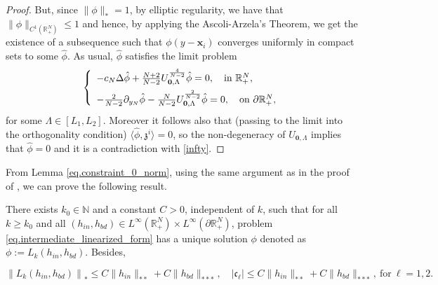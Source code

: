 \documentclass[11pt,a4paper]{amsart}
\begin{document}
\begin{proof}
But, since $\|\phi\|_*=1$, by elliptic regularity, we have that $\|\phi\|_{C^1(\mathbb R^N_+)}\leq 1$ and hence, by applying the Ascoli-Arzela's Theorem, we get the existence of a subsequence such that $\phi(y-\mathbf{x}_i)$ converges uniformly in compact sets to some $\hat\phi$. As usual, $\hat\phi$ satisfies the limit problem 
\begin{align}
  \left\{\begin{array}{l}
    -c_N\Delta \hat{\phi} +\frac{N+2}{N-2}  U_{\mathbf{0},\Lambda}^{\frac{4}{N-2}} \hat{\phi} = 0, \quad \text{in}~\mathbb{R}_{+}^{N},\vspace{5pt}\\
    -\frac{2}{N-2}\partial_{y_N}\hat{\phi} - \frac{N}{N-2} U_{\mathbf{0},\Lambda}^{\frac{2}{N-2}} \hat{\phi} = 0, \quad \text{on}~ \partial\mathbb{R}_{+}^{N},
  \end{array}\right.
\end{align}
for some $\Lambda \in\left[L_{1}, L_{2}\right]$. Moreover it follows also that (passing to the limit into the orthogonality condition) $\langle \hat \phi, \mathfrak z^i\rangle=0$, so the non-degeneracy of $ U_{\mathbf{0},\Lambda}$ \cite[Theorem 2.1]{Cruz-BlazquezPistoiaVaira_2022} implies that $\hat{\phi}=0$ and it is a contradiction with \eqref{infty}.
\end{proof}
From Lemma \ref{eq.constraint_0_norm}, using the same argument as in the proof of \cite[Proposition 4.1]{delPinoFelmerMusso_2004}, we can prove the following result.

\begin{proposition}\label{prop.linearized_problem_temp_result}
  There exists $k_{0}\in\mathbb N$ and a constant $C>0$, independent of $k$, such that for all $k \geq k_{0}$ and all $\left(h_{in},h_{bd}\right) \in L^{\infty}\left(\mathbb{R}_{+}^{N}\right) \times L^{\infty}\left(\partial\mathbb R^N_+\right)$, problem \eqref{eq.intermediate_linearized_form} has a unique solution $\phi$ denoted as $\phi := L_{k}\left(h_{in},h_{bd}\right)$. Besides,

\begin{equation}
\left\| L_{k}\left(h_{in},h_{bd}\right)\right\|_{*} \leq C\|h_{in}\|_{* *} + C \|h_{bd}\|_{***}, \quad\left|\mathfrak c_{\ell}\right| \leq C\|h_{in}\|_{* *} +C \|h_{bd}\|_{***}, ~\text{for}~ \ell =1,2.
\end{equation}
\end{proposition}
\end{document}
